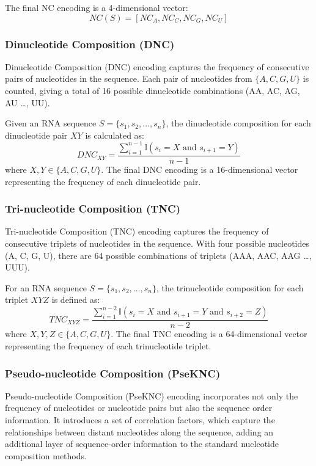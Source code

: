       The final NC encoding is a 4-dimensional vector:
      \[
        NC(S) = [NC_A, NC_C, NC_G, NC_U]
      \]

    \subsubsection{Dinucleotide Composition (DNC)}\label{subsubsec:dnc}
      Dinucleotide Composition (DNC) encoding captures the frequency of consecutive pairs of nucleotides in the sequence.
      Each pair of nucleotides from $\{A, C, G, U\}$ is counted, giving a total of 16 possible dinucleotide combinations (AA, AC, AG, AU \dots, UU).

      Given an RNA sequence $S = \{s_1, s_2, \dots, s_n\}$, the dinucleotide composition for each dinucleotide pair $XY$ is calculated as:
      \[
        DNC_{XY} = \frac{\sum_{i=1}^{n-1} \mathbb{I}(s_i = X \text{ and } s_{i+1} = Y)}{n-1}
      \]
      where $X, Y \in \{A, C, G, U\}$.
      The final DNC encoding is a 16-dimensional vector representing the frequency of each dinucleotide pair.

    \subsubsection{Tri-nucleotide Composition (TNC)}\label{subsubsec:tnc}
      Tri-nucleotide Composition (TNC) encoding captures the frequency of consecutive triplets of nucleotides in the sequence.
      With four possible nucleotides (A, C, G, U), there are 64 possible combinations of triplets (AAA, AAC, AAG \dots, UUU).

      For an RNA sequence $S = \{s_1, s_2, \dots, s_n\}$, the trinucleotide composition for each triplet $XYZ$ is defined as:
      \[
        TNC_{XYZ} = \frac{\sum_{i=1}^{n-2} \mathbb{I}(s_i = X \text{ and } s_{i+1} = Y \text{ and } s_{i+2} = Z)}{n-2}
      \]
      where $X, Y, Z \in \{A, C, G, U\}$.
      The final TNC encoding is a 64-dimensional vector representing the frequency of each trinucleotide triplet.

    \subsubsection{Pseudo-nucleotide Composition (PseKNC)}\label{subsubsec:pseknc}
      Pseudo-nucleotide Composition (PseKNC) encoding incorporates not only the frequency of nucleotides or nucleotide pairs but also the sequence order information.
      It introduces a set of correlation factors, which capture the relationships between distant nucleotides along the sequence, adding an additional layer of sequence-order information to the standard nucleotide composition methods.

